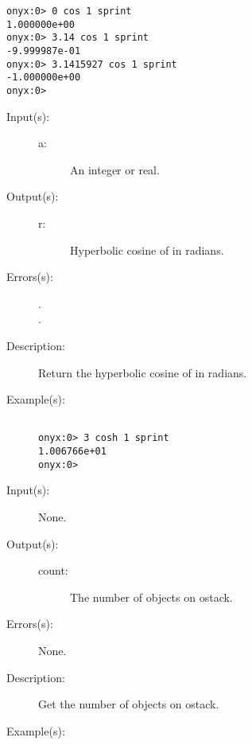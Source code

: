 \begin{description}
\begin{description}
\begin{verbatim}
onyx:0> 0 cos 1 sprint
1.000000e+00
onyx:0> 3.14 cos 1 sprint
-9.999987e-01
onyx:0> 3.1415927 cos 1 sprint
-1.000000e+00
onyx:0>
		\end{verbatim}
	\end{description}
\label{systemdict:cosh}
\item[{\onyxop{a}{cosh}{r}}: ]
	\begin{description}\item[]
	\item[Input(s): ]
		\begin{description}\item[]
		\item[a: ]
			An integer or real.
		\end{description}
	\item[Output(s): ]
		\begin{description}\item[]
		\item[r: ]
			Hyperbolic cosine of  in radians.
		\end{description}
	\item[Errors(s): ]
		\begin{description}\item[]
		\item[.]
		\item[.]
		\end{description}
	\item[Description: ]
		Return the hyperbolic cosine of  in radians.
	\item[Example(s): ]\begin{verbatim}

onyx:0> 3 cosh 1 sprint
1.006766e+01
onyx:0>
		\end{verbatim}
	\end{description}
\label{systemdict:count}
\item[{\onyxop{--}{count}{count}}: ]
	\begin{description}\item[]
	\item[Input(s): ] None.
	\item[Output(s): ]
		\begin{description}\item[]
		\item[count: ]
			The number of objects on ostack.
		\end{description}
	\item[Errors(s): ] None.
	\item[Description: ]
		Get the number of objects on ostack.
	\item[Example(s): ]\begin{verbatim}


\end{verbatim}
\end{description}
\end{description}
